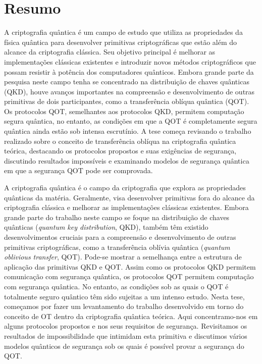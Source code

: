 

\chapter*{Resumo}



A criptografia quântica é um campo de estudo que utiliza as propriedades da física quântica para desenvolver primitivas criptográficas que estão além do alcance da criptografia clássica. Seu objetivo principal é melhorar as implementações clássicas existentes e introduzir novos métodos criptográficos que possam resistir à potência dos computadores quânticos. Embora grande parte da pesquisa neste campo tenha se concentrado na distribuição de chaves quânticas (QKD), houve avanços importantes na compreensão e desenvolvimento de outras primitivas de dois participantes, como a transferência oblíqua quântica (QOT). Os protocolos QOT, semelhantes aos protocolos QKD, permitem computação segura quântica, no entanto, as condições em que a QOT é completamente segura quântica ainda estão sob intensa escrutínio. A tese começa revisando o trabalho realizado sobre o conceito de transferência oblíqua na criptografia quântica teórica, destacando os protocolos propostos e suas exigências de segurança, discutindo resultados impossíveis e examinando modelos de segurança quântica em que a segurança QOT pode ser comprovada.



A criptografia quântica é o campo da criptografia que explora as propriedades quânticas da matéria. Geralmente, visa desenvolver primitivas fora do alcance da criptografia clássica e melhorar as implementações clássicas existentes. Embora grande parte do trabalho neste campo se foque na distribuição de chaves quânticas (\textit{quantum key distribution}, QKD), também têm existido desenvolvimentos cruciais para a compreensão e desenvolvimento de outras primitivas criptográficas, como a transferência oblívia quântica (\textit{quantum oblivious transfer}, QOT). Pode-se mostrar a semelhança entre a estrutura de aplicação das primitivas QKD e QOT. Assim como os protocolos QKD permitem comunicação com segurança quântica, os protocolos QOT permitem computação com segurança quântica. No entanto, as condições sob as quais o QOT é totalmente seguro quântico têm sido sujeitas a um intenso estudo. Nesta tese, começamos por fazer um levantamento do trabalho desenvolvido em torno do conceito de OT dentro da criptografia quântica teórica. Aqui concentramo-nos em alguns protocolos propostos e nos seus requisitos de segurança. Revisitamos os resultados de impossibilidade que intimidam esta primitiva e discutimos vários modelos quânticos de segurança sob os quais é possível provar a segurança do QOT.

